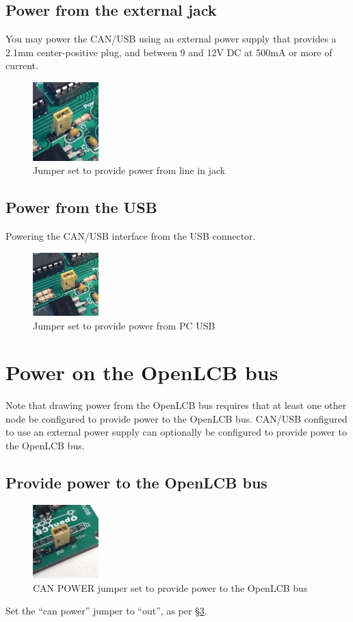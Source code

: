 \documentclass[15pt]{book}
\begin{document}
\subsection{Power from the external jack}
You may power the CAN/USB using an external power supply that provides a 2.1mm center-positive plug, and between 9 and 12V DC at 500mA or more of current. 
\begin{figure}[htbp]
\begin{center}
\includegraphics[width=1in]{images/power_line_in.png}
\caption{Jumper set to provide power from line in jack}
\label{CANOUT}
\end{center}
\end{figure}
\subsection{Power from the USB}
Powering the CAN/USB interface from the USB connector.
\begin{figure}[htbp]
\begin{center}
\includegraphics[width=1in]{images/power_line_usb.png}
\caption{Jumper set to provide power from PC USB}
\label{CANOUT}
\end{center}
\end{figure}
\section{Power on the OpenLCB bus}
Note that drawing power from the OpenLCB bus requires that at least one other node be configured to provide power to the OpenLCB bus.
CAN/USB configured to use an external power supply can optionally be configured to provide power to the OpenLCB bus.
\subsection{Provide power to the OpenLCB bus}
\begin{figure}[htbp]
\begin{center}
\includegraphics[width=1in]{images/power_out.png}
\caption{CAN POWER jumper set to provide power to the OpenLCB bus}
\label{CANOUT}
\end{center}
\end{figure}
Set the ``can power'' jumper to ``out'', as per \S\ref{CANOUT}.
\end{document}
